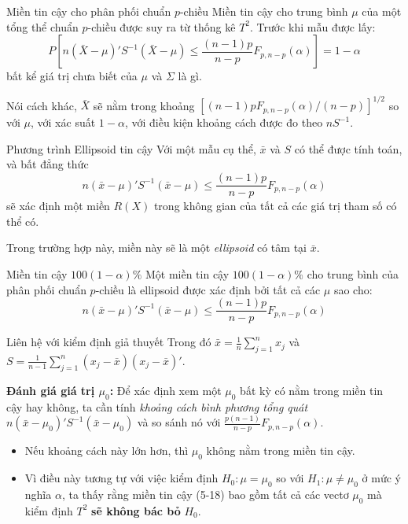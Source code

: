 \begin{frame}{Miền tin cậy cho phân phối chuẩn $p$-chiều}
    Miền tin cậy cho trung bình $\mu$ của một tổng thể chuẩn $p$-chiều được suy ra từ thống kê $T^2$. Trước khi mẫu được lấy:
    \[
        P\left[ n(\bar{X} - \mu)'S^{-1}(\bar{X} - \mu) \le \frac{(n - 1)p}{n - p} F_{p, n-p}(\alpha) \right] = 1 - \alpha \tag{$*1$}
    \]
    bất kể giá trị chưa biết của $\mu$ và $\Sigma$ là gì. 
    
    \vspace{0.3cm}
    Nói cách khác, $\bar{X}$ sẽ nằm trong khoảng $[(n - 1)p F_{p, n-p}(\alpha)/(n - p)]^{1/2}$ so với $\mu$, với xác suất $1 - \alpha$, với điều kiện khoảng cách được đo theo $nS^{-1}$. 
\end{frame}

\begin{frame}{Phương trình Ellipsoid tin cậy}
    Với một mẫu cụ thể, $\bar{x}$ và $S$ có thể được tính toán, và bất đẳng thức
    \[
        n(\bar{x} - \mu)'S^{-1}(\bar{x} - \mu) \le \frac{(n - 1)p}{n - p} F_{p, n-p}(\alpha)
    \]
    sẽ xác định một miền $R(X)$ trong không gian của tất cả các giá trị tham số có thể có. 
    
    \vspace{0.3cm}
    Trong trường hợp này, miền này sẽ là một \textit{ellipsoid} có tâm tại $\bar{x}$.
    \begin{block}{Miền tin cậy $100(1-\alpha)\%$}
        Một miền tin cậy $100(1 - \alpha)\%$ cho trung bình của phân phối chuẩn $p$-chiều là ellipsoid được xác định bởi tất cả các $\mu$ sao cho:
        \[
            n(\bar{x} - \mu)'S^{-1}(\bar{x} - \mu) \le \frac{(n - 1)p}{n - p} F_{p, n-p}(\alpha) \tag{5-18}
        \]
    \end{block}
\end{frame}

\begin{frame}{Liên hệ với kiểm định giả thuyết}
    Trong đó $\bar{x} = \frac{1}{n} \sum_{j=1}^n x_j$ và $S = \frac{1}{n-1} \sum_{j=1}^n (x_j - \bar{x})(x_j - \bar{x})'$.
    
    \vspace{0.3cm}
    \textbf{Đánh giá giá trị $\mu_0$:}
    Để xác định xem một $\mu_0$ bất kỳ có nằm trong miền tin cậy hay không, ta cần tính \textit{khoảng cách bình phương tổng quát} $n(\bar{x} - \mu_0)'S^{-1}(\bar{x} - \mu_0)$ và so sánh nó với $\frac{p(n - 1)}{n - p} F_{p, n-p}(\alpha)$. 
    
    \begin{itemize}
        \item Nếu khoảng cách này lớn hơn, thì $\mu_0$ không nằm trong miền tin cậy.
        \item Vì điều này tương tự với việc kiểm định $H_0: \mu = \mu_0$ so với $H_1: \mu \ne \mu_0$ ở mức ý nghĩa $\alpha$, ta thấy rằng miền tin cậy (5-18) bao gồm tất cả các vectơ $\mu_0$ mà kiểm định $T^2$ \textbf{sẽ không bác bỏ} $H_0$.
    \end{itemize}
\end{frame}

